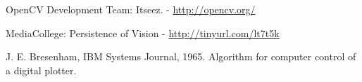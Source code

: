 \begin{thebibliography}{11}
		OpenCV Development Team: Itseez.  -  \url{http://opencv.org/}
		
	MediaCollege: Persistence of Vision  - \url{http://tinyurl.com/lt7t5k}
	
		J. E. Bresenham, IBM Systems Journal, 1965. Algorithm for computer control of a digital plotter.
	
\end{thebibliography}